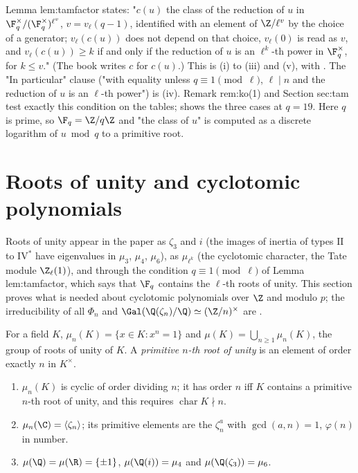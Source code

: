 \begin{paperlink}\label{pl:rings:tamfactor}
Lemma lem:tamfactor states: "$c(u)$ the class of the reduction of $u$ in $\F_q^\times/(\F_q^\times)^{\ell^{v}}$, $v=v_\ell(q-1)$, identified with an element of
$\Z/\ell^{v}$ by the choice of a generator; $v_\ell(c(u))$ does not depend on that choice, $v_\ell(0)$ is read as $v$, and $v_\ell(c(u))\ge k$ if and only if
the reduction of $u$ is an $\ell^k$-th power in $\F_q^\times$, for $k\le v$." (The book writes $c$ for $c(u)$.) This is (i) to (iii) and (v), with .
The "In particular" clause ("with equality unless $q\equiv1\pmod\ell$, $\ell\mid n$ and the reduction of $u$ is an $\ell$-th power") is (iv). Remark
rem:ko(1) and Section sec:tam test exactly this condition on the tables;  shows the three cases at $q=19$.
Here $q$ is prime, so $\F_q=\Z/q\Z$ and "the class of $u$" is computed as a discrete logarithm of $u\bmod q$ to a primitive root.
\end{paperlink}

\section{Roots of unity and cyclotomic polynomials}\label{sec:rings:cyclotomic}

Roots of unity appear in the paper as $\zeta_3$ and $i$ (the images of inertia of types $\mathrm{II}$ to $\mathrm{IV}^*$ have eigenvalues in $\mu_3$, $\mu_4$,
$\mu_6$), as $\mu_{\ell^k}$ (the cyclotomic character, the Tate module $\Z_\ell(1)$), and through the condition $q\equiv1\pmod\ell$ of Lemma
lem:tamfactor, which says that $\F_q$ contains the $\ell$-th roots of unity. This section proves what is needed about cyclotomic
polynomials over $\Z$ and modulo $p$; the irreducibility of all $\Phi_n$ and $\Gal(\Q(\zeta_n)/\Q)\simeq(\Z/n)^\times$ are .

\begin{definition}\label{def:rings:roots-of-unity}
For a field $K$, $\mu_n(K)=\{x\in K:x^n=1\}$ and $\mu(K)=\bigcup_{n\ge1}\mu_n(K)$, the group of roots of unity of $K$. A \emph{primitive $n$-th root of
unity} is an element of order exactly $n$ in $K^\times$.
\end{definition}

\begin{proposition}\label{prop:rings:roots-of-unity}
\begin{enumerate}[label=(\roman*)]
\item $\mu_n(K)$ is cyclic of order dividing $n$; it has order $n$ iff $K$ contains a primitive $n$-th root of unity, and this requires
$\operatorname{char}K\nmid n$.
\item $\mu_n(\C)=\langle\zeta_n\rangle$; its primitive elements are the $\zeta_n^a$ with $\gcd(a,n)=1$, $\varphi(n)$ in number.
\item $\mu(\Q)=\mu(\R)=\{\pm1\}$, $\mu(\Q(i))=\mu_4$ and $\mu(\Q(\zeta_3))=\mu_6$.
\end{enumerate}
\end{proposition}

